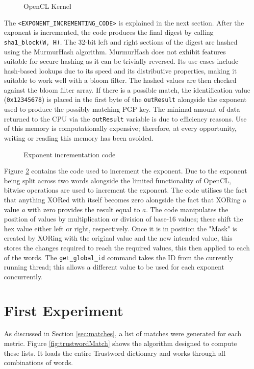 \begin{figure}[!h]
  \centering
  
  \caption{OpenCL Kernel}
  \label{fig:opencl}
\end{figure}

The \verb|<EXPONENT_INCREMENTING_CODE>| is explained in the next section. After the exponent is incremented, the code produces the final digest by calling \verb|sha1_block(W, H)|. The 32-bit left and right sections of the digest are hashed using the MurmurHash algorithm. MurmurHash does not exhibit features suitable for secure hashing as it can be trivially reversed. Its use-cases include hash-based lookups due to its speed and its distributive properties, making it suitable to work well with a bloom filter. The hashed values are then checked against the bloom filter array. If there is a possible match, the identification value (\verb|0x12345678|) is placed in the first byte of the \verb|outResult| alongside the exponent used to produce the possibly matching PGP key. The minimal amount of data returned to the CPU via the \verb|outResult| variable is due to efficiency reasons. Use of this memory is computationally expensive; therefore, at every opportunity, writing or reading this memory has been avoided.

\begin{figure}[!h]
  \centering
  
  \caption{Exponent incrementation code}
  \label{fig:increment}
\end{figure}

Figure \ref{fig:increment} contains the code used to increment the exponent. Due to the exponent being split across two words alongside the limited functionality of OpenCL, bitwise operations are used to increment the exponent. The code utilises the fact that anything XORed with itself becomes zero alongside the fact that XORing a value $a$ with zero provides the result equal to $a$. The code manipulates the position of values by multiplication or division  of base-16 values; these shift the hex value either left or right, respectively. Once it is in position the "Mask" is created by XORing with the original value and the new intended value, this stores the changes required to reach the required values, this then applied to each of the words.
The \verb|get_global_id| command takes the ID from the currently running thread; this allows a different value to be used for each exponent concurrently.

\newpage

\section{First Experiment}
\label{sec:exp1_implemtation}
As discussed in Section \ref{sec:matches}, a list of matches were generated for each metric. Figure \ref{fig:trustwordMatch} shows the algorithm designed to compute these lists. It loads the entire Trustword dictionary and works through all combinations of words.

